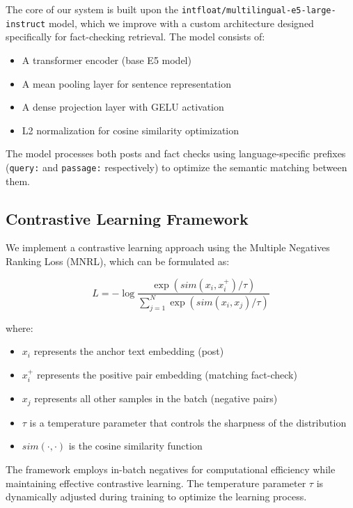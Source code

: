 \documentclass[11pt]{article}
\begin{document}
The core of our system is built upon the \texttt{intfloat/multilingual-e5-large-instruct} model, which we improve with a custom architecture designed specifically for fact-checking retrieval. The model consists of:

\begin{itemize}
    \item A transformer encoder (base E5 model)
    \item A mean pooling layer for sentence representation
    \item A dense projection layer with GELU activation
    \item L2 normalization for cosine similarity optimization
\end{itemize}

The model processes both posts and fact checks using language-specific prefixes (\texttt{query:} and \texttt{passage:} respectively) to optimize the semantic matching between them.

\subsection{Contrastive Learning Framework}

We implement a contrastive learning approach using the Multiple Negatives Ranking Loss (MNRL), which can be formulated as:

\begin{equation}
L = -\log \frac{\exp(sim(x_i, x_i^+)/\tau)}{\sum_{j=1}^{N} \exp(sim(x_i, x_j)/\tau)}
\end{equation}

where:
\begin{itemize}
    \item $x_i$ represents the anchor text embedding (post)
    \item $x_i^+$ represents the positive pair embedding (matching fact-check)
    \item $x_j$ represents all other samples in the batch (negative pairs)
    \item $\tau$ is a temperature parameter that controls the sharpness of the distribution
    \item $sim(\cdot,\cdot)$ is the cosine similarity function
\end{itemize}

The framework employs in-batch negatives for computational efficiency while maintaining effective contrastive learning. The temperature parameter $\tau$ is dynamically adjusted during training to optimize the learning process.
\end{document}
